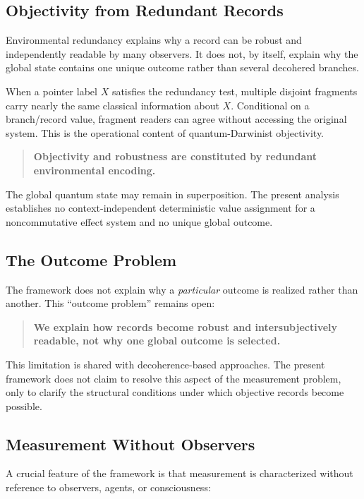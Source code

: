 \documentclass[12pt,a4paper]{article}
\begin{document}
\subsection{Objectivity from Redundant Records}

Environmental redundancy explains why a record can be robust and independently readable by many observers.  It does not, by itself, explain why the global state contains one unique outcome rather than several decohered branches.

When a pointer label $X$ satisfies the redundancy test, multiple disjoint fragments carry nearly the same classical information about $X$.  Conditional on a branch/record value, fragment readers can agree without accessing the original system.  This is the operational content of quantum-Darwinist objectivity.

\begin{quote}
\textbf{Objectivity and robustness are constituted by redundant environmental encoding.}
\end{quote}

The global quantum state may remain in superposition.  The present analysis establishes no context-independent deterministic value assignment for a noncommutative effect system and no unique global outcome.

\subsection{The Outcome Problem}

The framework does not explain why a \emph{particular} outcome is realized rather than another. This ``outcome problem'' remains open:

\begin{quote}
\textbf{We explain how records become robust and intersubjectively readable, not why one global outcome is selected.}
\end{quote}

This limitation is shared with decoherence-based approaches. The present framework does not claim to resolve this aspect of the measurement problem, only to clarify the structural conditions under which objective records become possible.

\subsection{Measurement Without Observers}

A crucial feature of the framework is that measurement is characterized without reference to observers, agents, or consciousness:
\end{document}
